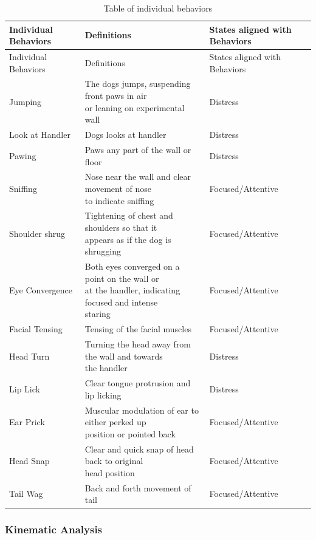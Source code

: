 \documentclass[
]{article}
\begin{document}
\begin{longtable}[]{@{}lll@{}}
\caption{\label{tab:indiv-behav-table}Table of individual behaviors}\tabularnewline
\toprule\noalign{}
Individual Behaviors & Definitions & States aligned with Behaviors \\
\midrule\noalign{}
\endfirsthead
\toprule\noalign{}
Individual Behaviors & Definitions & States aligned with Behaviors \\
\midrule\noalign{}
\endhead
\bottomrule\noalign{}
\endlastfoot
Jumping & \makecell[l]{The dogs jumps, suspending front paws in air\\or leaning on experimental wall} & Distress \\
Look at Handler & Dogs looks at handler & Distress \\
Pawing & Paws any part of the wall or floor & Distress \\
Sniffing & \makecell[l]{Nose near the wall and clear movement of nose\\to indicate sniffing} & Focused/Attentive \\
Shoulder shrug & \makecell[l]{Tightening of chest and shoulders so that it\\appears as if the dog is shrugging} & Focused/Attentive \\
Eye Convergence & \makecell[l]{Both eyes converged on a point on the wall or\\at the handler, indicating focused and intense\\staring} & Focused/Attentive \\
Facial Tensing & Tensing of the facial muscles & Focused/Attentive \\
Head Turn & \makecell[l]{Turning the head away from the wall and towards\\the handler} & Distress \\
Lip Lick & Clear tongue protrusion and lip licking & Distress \\
Ear Prick & \makecell[l]{Muscular modulation of ear to either perked up\\position or pointed back} & Focused/Attentive \\
Head Snap & \makecell[l]{Clear and quick snap of head back to original\\head position} & Focused/Attentive \\
Tail Wag & Back and forth movement of tail & Focused/Attentive \\
\end{longtable}

\hypertarget{kinematic-analysis}{%
\subsubsection{Kinematic Analysis}\label{kinematic-analysis}}
\end{document}
